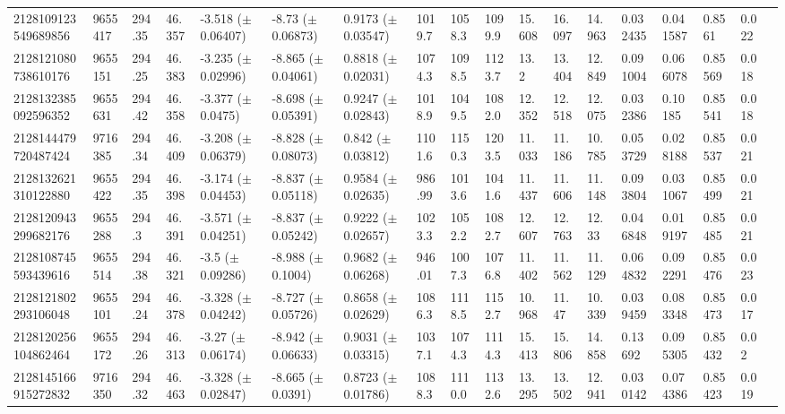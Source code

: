 \begin{sidewaystable}[htbp]
{\begin{tabular}{llllllllllllllllll}
        2128109123549689856 & 9655417 & 294.35 & 46.357 & -3.518 ($\pm$ 0.06407) & -8.73 ($\pm$ 0.06873) & 0.9173 ($\pm$ 0.03547) & 1019.7 & 1058.3 & 1099.9 & 15.608 & 16.097 & 14.963 & 0.032435 & 0.041587 & 0.8561 & 0.022 & \\
        2128121080738610176 & 9655151 & 294.25 & 46.383 & -3.235 ($\pm$ 0.02996) & -8.865 ($\pm$ 0.04061) & 0.8818 ($\pm$ 0.02031) & 1074.3 & 1098.5 & 1123.7 & 13.2 & 13.404 & 12.849 & 0.091004 & 0.066078 & 0.85569 & 0.018 & \\
        2128132385092596352 & 9655631 & 294.42 & 46.358 & -3.377 ($\pm$ 0.0475) & -8.698 ($\pm$ 0.05391) & 0.9247 ($\pm$ 0.02843) & 1018.9 & 1049.5 & 1082.0 & 12.352 & 12.518 & 12.075 & 0.032386 & 0.10185 & 0.85541 & 0.018 & \\
        2128144479720487424 & 9716385 & 294.34 & 46.409 & -3.208 ($\pm$ 0.06379) & -8.828 ($\pm$ 0.08073) & 0.842 ($\pm$ 0.03812) & 1101.6 & 1150.3 & 1203.5 & 11.033 & 11.186 & 10.785 & 0.053729 & 0.028188 & 0.85537 & 0.021 & \\
        2128132621310122880 & 9655422 & 294.35 & 46.398 & -3.174 ($\pm$ 0.04453) & -8.837 ($\pm$ 0.05118) & 0.9584 ($\pm$ 0.02635) & 986.99 & 1013.6 & 1041.6 & 11.437 & 11.606 & 11.148 & 0.093804 & 0.031067 & 0.85499 & 0.021 & \\
        2128120943299682176 & 9655288 & 294.3 & 46.391 & -3.571 ($\pm$ 0.04251) & -8.837 ($\pm$ 0.05242) & 0.9222 ($\pm$ 0.02657) & 1023.3 & 1052.2 & 1082.7 & 12.607 & 12.763 & 12.33 & 0.046848 & 0.019197 & 0.85485 & 0.021 & \\
        2128108745593439616 & 9655514 & 294.38 & 46.321 & -3.5 ($\pm$ 0.09286) & -8.988 ($\pm$ 0.1004) & 0.9682 ($\pm$ 0.06268) & 946.01 & 1007.3 & 1076.8 & 11.402 & 11.562 & 11.129 & 0.064832 & 0.092291 & 0.85476 & 0.023 & \\
        2128121802293106048 & 9655101 & 294.24 & 46.378 & -3.328 ($\pm$ 0.04242) & -8.727 ($\pm$ 0.05726) & 0.8658 ($\pm$ 0.02629) & 1086.3 & 1118.5 & 1152.7 & 10.968 & 11.47 & 10.339 & 0.039459 & 0.083348 & 0.85473 & 0.017 & \\
        2128120256104862464 & 9655172 & 294.26 & 46.313 & -3.27 ($\pm$ 0.06174) & -8.942 ($\pm$ 0.06633) & 0.9031 ($\pm$ 0.03315) & 1037.1 & 1074.3 & 1114.3 & 15.413 & 15.806 & 14.858 & 0.13692 & 0.095305 & 0.85432 & 0.02 & \\
        2128145166915272832 & 9716350 & 294.32 & 46.463 & -3.328 ($\pm$ 0.02847) & -8.665 ($\pm$ 0.0391) & 0.8723 ($\pm$ 0.01786) & 1088.3 & 1110.0 & 1132.6 & 13.295 & 13.502 & 12.941 & 0.030142 & 0.074386 & 0.85423 & 0.019 & \\

\end{tabular}}
\end{sidewaystable}

